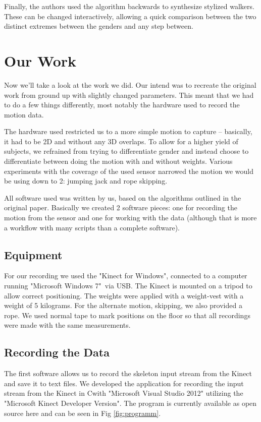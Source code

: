 \documentclass[a4paper]{article}
\newcommand{\CS}{C\nolinebreak\hspace{-.05em}\raisebox{.6ex}{\scriptsize\bf \#\ }}
\begin{document}
Finally, the authors used the algorithm backwards to synthesize stylized walkers.
These can be changed interactively, allowing a quick comparison between the two distinct extremes between the genders and any step between.

\section{Our Work}

Now we'll take a look at the work we did.
Our intend was to recreate the original work from ground up with slightly changed parameters.
This meant that we had to do a few things differently, most notably the hardware used to record the motion data.

The hardware used restricted us to a more simple motion to capture – basically, it had to be 2D and without any 3D overlaps.
To allow for a higher yield of subjects, we refrained from trying to differentiate gender and instead choose to differentiate between doing the motion with and without weights.
Various experiments with the coverage of the used sensor narrowed the motion we would be using down to 2: jumping jack and rope skipping.

All software used was written by us, based on the algorithms outlined in the original paper.
Basically we created 2 software pieces: one for recording the motion from the sensor and one for working with the data (although that is more a workflow with many scripts than a complete software).

\subsection{Equipment}

For our recording we used the "Kinect for Windows"\texttrademark \cite{kinect}, connected to a computer running "Microsoft Windows 7"\textregistered \ via USB.
The Kinect is mounted on a tripod to allow correct positioning.
The weights were applied with a weight-vest with a weight of 5 kilograms.
For the alternate motion, skipping, we also provided a rope.
We used normal tape to mark positions on the floor so that all recordings were made with the same measurements.

\subsection{Recording the Data}

The first software allows us to record the skeleton input stream from the Kinect and save it to text files.
We developed the application for recording the input stream from the Kinect in \CS with "Microsoft Visual Studio 2012" utilizing the "Microsoft Kinect Developer Version".
The program is currently available as open source here \cite{csprogram} and can be seen in Fig \ref{fig:programm}.
\end{document}
